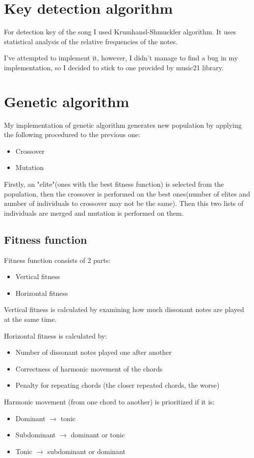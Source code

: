 \documentclass{article}
\begin{document}
\section{Key detection algorithm}

For detection key of the song I used Krumhansl-Shmuckler algorithm. It uses
statistical analysis of the relative frequencies of the notes.

I've attempted to implement it, however, I didn't manage to find a bug in my
implementation, so I decided to stick to one provided by music21 library.

\section{Genetic algorithm}

My implementation of genetic algorithm generates new population by applying the
following procedured to the previous one:
\begin{itemize}
  \item Crossover
  \item Mutation
\end{itemize}

Firstly, an "elite"(ones with the best fitness function) is selected from the
population, then the crossover is performed on the best ones(number of elites
and number of individuals to crossover may not be the same). Then this two lists
of individuals are merged and mutation is performed on them.

\subsection{Fitness function}

Fitness function consists of 2 parts:
\begin{itemize}
  \item Vertical fitness
  \item Horizontal fitness
\end{itemize}

Vertical fitness is calculated by examining how much dissonant notes are played
at the same time.

Horizontal fitness is calculated by:
\begin{itemize}
  \item Number of dissonant notes played one after another
  \item Correctness of harmonic movement of the chords
  \item Penalty for repeating chords (the closer repeated chords, the worse)
\end{itemize}

Harmonic movement (from one chord to another) is prioritized if it is:
\begin{itemize}
  \item Dominant $\rightarrow$ tonic
  \item Subdominant $\rightarrow$ dominant or tonic
  \item Tonic $\rightarrow$ subdominant or dominant
\end{itemize}
\end{document}

